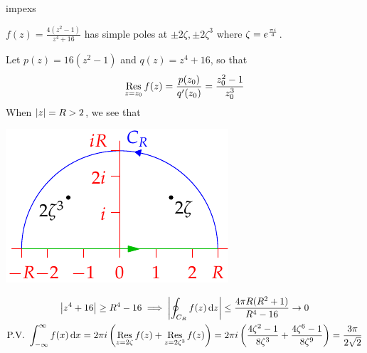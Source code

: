 \begin{examples}{}{impexs}
\begin{enumerate}
	  
	  \begin{minipage}[t]{0.65\linewidth}\vspace{0pt}
			\item $f(z)=\frac{4(z^2-1)}{z^4+16}$ has simple poles at $\pm 2\zeta,\pm 2\zeta^3$ where $\zeta=e^{\frac{\pi i}{4}}$.\par
			Let $p(z)=16(z^2-1)$ and $q(z)=z^4+16$, so that
		  \[
		  	\operatorname*{Res}\limits_{z=z_0}f(z)=\frac{p(z_0)}{q'(z_0)}=\frac{z_0^2-1}{z_0^3}
		  \]
			When $\left| z\right|=R>2$, we see that
		\end{minipage}
		\hfill
		\begin{minipage}[t]{0.34\linewidth}\vspace{0pt}
			\flushright\includegraphics[scale=0.95]{integral3}
		\end{minipage}\par\vspace{-5pt}
	  \begin{gather*}
		  \nm{z^4+16}\ge R^4-16
		  	\implies \nm{\oint_{C_R}f(z)\,\dz}
		  	\le\frac{4\pi R(R^2+1)}{R^4-16}\to 0\\
		  \text{P.V.\ }\int_{-\infty}^\infty f(x)\,\dx 
		  	=2\pi i\left(\Resl{z=2\zeta}f(z)+\Resl{z=2\zeta^3}f(z)\right) 
		  	=2\pi i\left(\frac{4\zeta^2-1}{8\zeta^3}+\frac{4\zeta^6-1}{8\zeta^9}\right) 
		  	=\frac{3\pi}{2\sqrt 2}%
	  \end{gather*}
	  

\end{enumerate}
\end{examples}
